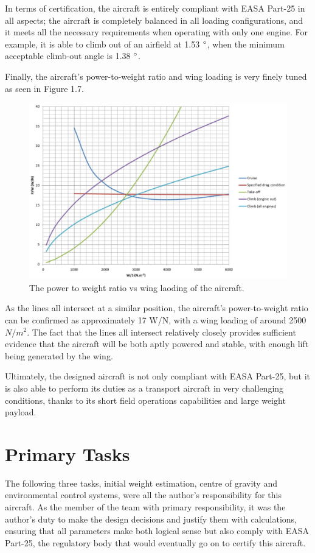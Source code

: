\documentclass[stu, a4paper, 12pt, floatsintext]{apa7}
\numberwithin{figure}{section}
\numberwithin{table}{section}
\numberwithin{equation}{section}
\begin{document}
In terms of certification, the aircraft is entirely compliant with EASA Part-25 in all aspects; the aircraft is completely balanced in all loading configurations, and it meets all the necessary requirements when operating with only one engine. For example, it is able to climb out of an airfield at 1.53 $\degree$, when the minimum acceptable climb-out angle is 1.38 $\degree$. 

Finally, the aircraft’s power-to-weight ratio and wing loading is very finely tuned as seen in Figure 1.7.

\begin{figure}[H]
    \caption{The power to weight ratio vs wing laoding of the aircraft.}
    \label{fig:power_to_weight}
    \centering
    \includegraphics[width=1.1\textwidth]{pictures/power-to-weight.jpg}
\end{figure}

As the lines all intersect at a similar position, the aircraft’s power-to-weight ratio can be confirmed as approximately 17 W/N, with a wing loading of around 2500 $N/m^2$. The fact that the lines all intersect relatively closely provides sufficient evidence that the aircraft will be both aptly powered and stable, with enough lift being generated by the wing.  

Ultimately, the designed aircraft is not only compliant with EASA Part-25, but it is also able to perform its duties as a transport aircraft in very challenging conditions, thanks to its short field operations capabilities and large weight payload.      

\section{Primary Tasks}
The following three tasks, initial weight estimation, centre of gravity and environmental control systems, were all the author's responsibility for this aircraft. As the member of the team with primary responsibility, it was the author’s duty to make the design decisions and justify them with calculations, ensuring that all parameters make both logical sense but also comply with EASA Part-25, the regulatory body that would eventually go on to certify this aircraft.
\end{document}
